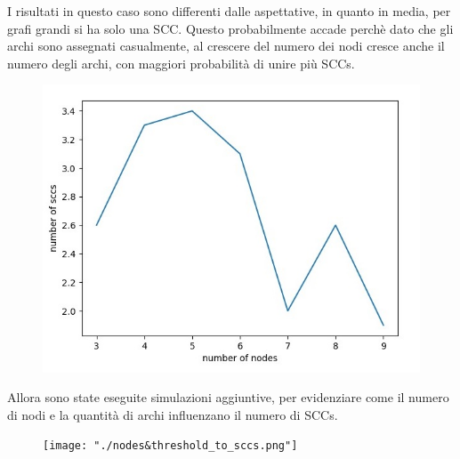 \documentclass{article}
\begin{document}
\newpage

I risultati in questo caso sono differenti dalle aspettative, in quanto in media, per grafi grandi si ha solo una SCC. Questo probabilmente accade perchè dato che gli archi sono assegnati casualmente, al crescere del numero dei nodi cresce anche il numero degli archi, con maggiori probabilità di unire più SCCs. 
\begin{figure}[!h]
\centering
\includegraphics[width=0.45\linewidth]
{"./sccs_to_nodes.jpg"}
\label{graph}
\end{figure}
\newline
Allora sono state eseguite simulazioni aggiuntive, per evidenziare come il numero di nodi e la quantità di archi influenzano il numero di SCCs.
\begin{figure}[!h]
\centering
\texttt{[image: "./nodes\&threshold\_to\_sccs.png"]}
\label{graph}
\end{figure}
\end{document}
